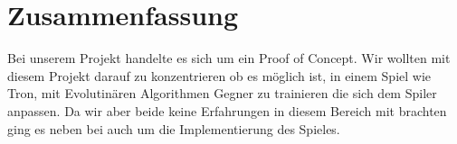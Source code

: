 \section{Zusammenfassung}

Bei unserem Projekt handelte es sich um ein Proof of Concept. Wir wollten mit diesem Projekt darauf zu konzentrieren ob es möglich ist, in einem Spiel wie Tron, mit Evolutinären Algorithmen Gegner zu trainieren die sich dem Spiler anpassen. Da wir aber beide keine Erfahrungen in diesem Bereich mit brachten ging es neben bei auch um die Implementierung des Spieles. 
